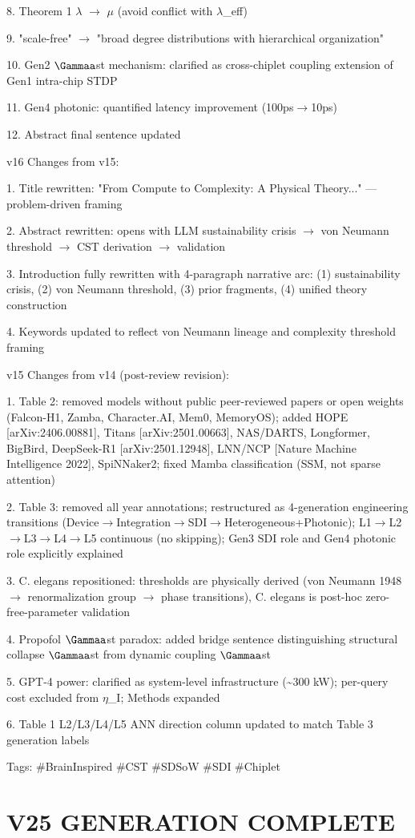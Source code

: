 \documentclass[a4paper,12pt]{article}
\begin{document}
8. Theorem 1 $\lambda$ $\rightarrow$ $\mu$ (avoid conflict with $\lambda$\_eff)

9. "scale-free" $\rightarrow$ "broad degree distributions with hierarchical organization"

10. Gen2 $\Gammaa$st mechanism: clarified as cross-chiplet coupling extension of Gen1 intra-chip STDP

11. Gen4 photonic: quantified latency improvement (100ps$\rightarrow$10ps)

12. Abstract final sentence updated

v16 Changes from v15:

1. Title rewritten: "From Compute to Complexity: A Physical Theory..." --- problem-driven framing

2. Abstract rewritten: opens with LLM sustainability crisis $\rightarrow$ von Neumann threshold $\rightarrow$ CST derivation $\rightarrow$ validation

3. Introduction fully rewritten with 4-paragraph narrative arc: (1) sustainability crisis, (2) von Neumann threshold, (3) prior fragments, (4) unified theory construction

4. Keywords updated to reflect von Neumann lineage and complexity threshold framing

v15 Changes from v14 (post-review revision):

1. Table 2: removed models without public peer-reviewed papers or open weights (Falcon-H1, Zamba, Character.AI, Mem0, MemoryOS); added HOPE [arXiv:2406.00881], Titans [arXiv:2501.00663], NAS/DARTS, Longformer, BigBird, DeepSeek-R1 [arXiv:2501.12948], LNN/NCP [Nature Machine Intelligence 2022], SpiNNaker2; fixed Mamba classification (SSM, not sparse attention)

2. Table 3: removed all year annotations; restructured as 4-generation engineering transitions (Device$\rightarrow$Integration$\rightarrow$SDI$\rightarrow$Heterogeneous+Photonic); L1$\rightarrow$L2$\rightarrow$L3$\rightarrow$L4$\rightarrow$L5 continuous (no skipping); Gen3 SDI role and Gen4 photonic role explicitly explained

3. C. elegans repositioned: thresholds are physically derived (von Neumann 1948 $\rightarrow$ renormalization group $\rightarrow$ phase transitions), C. elegans is post-hoc zero-free-parameter validation

4. Propofol $\Gammaa$st paradox: added bridge sentence distinguishing structural collapse $\Gammaa$st from dynamic coupling $\Gammaa$st

5. GPT-4 power: clarified as system-level infrastructure (\textasciitilde{}300 kW); per-query cost excluded from $\eta$\_I; Methods expanded

6. Table 1 L2/L3/L4/L5 ANN direction column updated to match Table 3 generation labels

Tags: \#BrainInspired \#CST \#SDSoW \#SDI \#Chiplet

\section*{V25 GENERATION COMPLETE}
\end{document}
